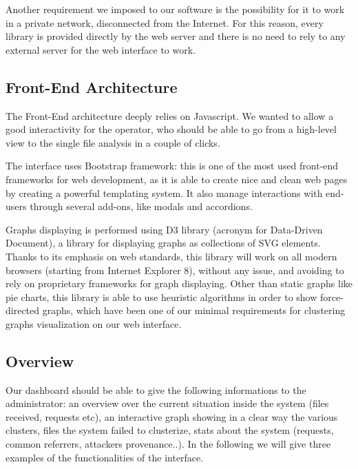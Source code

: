 Another requirement we imposed to our software is the possibility for it to work in a private network, disconnected from the Internet. For this reason, every library is provided directly by the web server and there is no need to rely to any external server for the web interface to work.

\subsection{Front-End Architecture}

The Front-End architecture deeply relies on Javascript. We wanted to allow a good interactivity for the operator, who should be able to go from a high-level view to the single file analysis in a couple of clicks.

The interface uses Bootstrap \cite{bootstrap} framework: this is one of the most used front-end frameworks for web development, as it is able to create nice and clean web pages by creating a powerful templating system. It also manage interactions with end-users through several add-ons, like modals and accordions.

Graphs displaying is performed using D3 library \cite{d3_home} (acronym for Data-Driven Document), a library for displaying graphs as collections of SVG elements. Thanks to its emphasis on web standards, this library will work on all modern browsers (starting from Internet Explorer 8), without any issue, and avoiding to rely on proprietary frameworks for graph displaying. Other than static graphs like pie charts, this library is able to use heuristic algorithms in order  to show force-directed graphs, which have been one of our minimal requirements for clustering graphs visualization on our web interface.

\subsection{Overview}

Our dashboard should be able to give the following informations to the administrator: an overview over the current situation inside the system (files received, requests etc), an interactive graph showing in a clear way the various clusters, files the system failed to clusterize, stats about the system (requests, common referrers, attackers provenance..). In the following we will give three examples of the functionalities of the interface.

